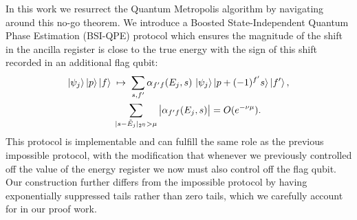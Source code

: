 \documentclass[aps,floatfix,10pt,amssymb,amsfont,amsmath,superscriptaddress,float,nofootinbib,longbibliography,nobalancelastpage,twocolumn]{revtex4-2}
\begin{document}
In this work we resurrect the Quantum Metropolis algorithm by navigating around this no-go theorem. We introduce a Boosted State-Independent Quantum Phase Estimation (BSI-QPE) protocol which ensures the magnitude of the shift in the ancilla register is close to the true energy with the sign of this shift recorded in an additional flag qubit:
\begin{multline}
  \ket{\psi_j}\ket{p}\ket{f} \;\mapsto\; \sum_{s,f'} \alpha_{f'f}(E_j,s)\,
  \ket{\psi_j}\ket{p+(-1)^{f'}s}\ket{f'},\\
  \qquad \sum_{|s-\tilde E_j|_{2^{\eta}} > \mu} \big|\alpha_{f'f}(E_j,s)\big| = O(e^{-\nu\mu}).
\end{multline}
This protocol is implementable and can fulfill the same role as the previous impossible protocol, with the modification that whenever we previously controlled off the value of the energy register we now must also control off the flag qubit. Our construction further differs from the impossible protocol by having exponentially suppressed tails rather than zero tails, which we carefully account for in our proof work.
\end{document}
